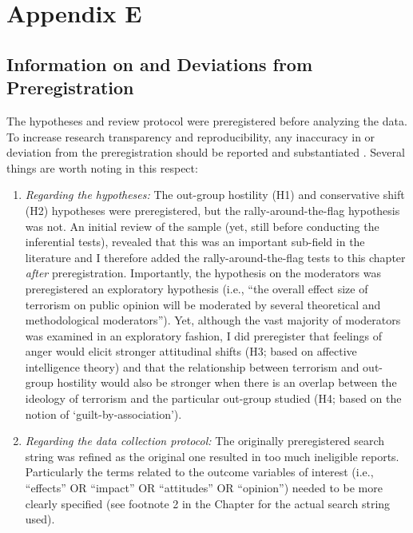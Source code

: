 
\chapter[Appendix E]{Appendix E}

\section{Information on and Deviations from Preregistration}
\label{app:E1}
The hypotheses and review protocol were preregistered before analyzing the data. To increase research transparency and reproducibility, any inaccuracy in or deviation from the preregistration should be reported and substantiated \citep{NHB2020}. Several things are worth noting in this respect:

\begin{enumerate}
\item \textit{Regarding the hypotheses:} The out-group hostility (H1) and conservative shift (H2) hypotheses were preregistered, but the rally-around-the-flag hypothesis was not. An initial review of the sample (yet, still before conducting the inferential tests), revealed that this was an important sub-field in the literature and I therefore added the rally-around-the-flag tests to this chapter \textit{after} preregistration. Importantly, the hypothesis on the moderators was preregistered an exploratory hypothesis (i.e., ``the overall effect size of terrorism on public opinion will be moderated by several theoretical and methodological moderators''). Yet, although the vast majority of moderators was examined in an exploratory fashion, I did preregister that feelings of anger would elicit stronger attitudinal shifts (H3; based on affective intelligence theory) and that the relationship between terrorism and out-group hostility would also be stronger when there is an overlap between the ideology of terrorism and the particular out-group studied (H4; based on the notion of `guilt-by-association').


\item \textit{Regarding the data collection protocol:} The originally preregistered search string was refined as the original one resulted in too much ineligible reports. Particularly the terms related to the outcome variables of interest (i.e., “effects” OR “impact” OR “attitudes” OR “opinion”) needed to be more clearly specified (see footnote 2 in the Chapter for the actual search string used).


\end{enumerate}
